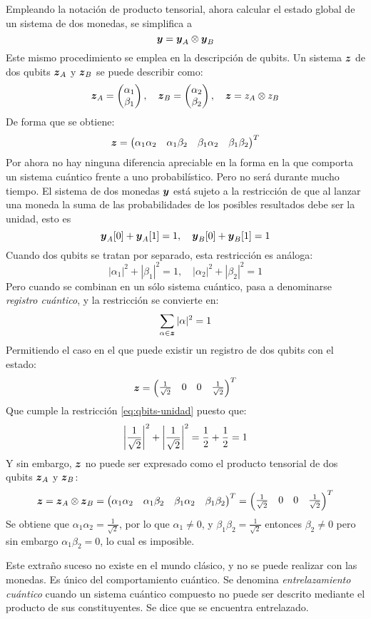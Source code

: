 Empleando la notación de producto tensorial, ahora calcular el estado global de 
un sistema de dos monedas, se simplifica a
%
$$ \boldsymbol{y} = \boldsymbol{y}_A \otimes \boldsymbol{y}_B $$
%
Este mismo procedimiento se emplea en la descripción de qubits. Un sistema $\boldsymbol{z}$ de dos qubits $\boldsymbol{z}_A$ y $\boldsymbol{z}_B$ se puede describir como:
%
$$
\boldsymbol{z}_A = \begin{pmatrix} \alpha_1 \\ \beta_1 \end{pmatrix}, \quad
\boldsymbol{z}_B = \begin{pmatrix} \alpha_2 \\ \beta_2 \end{pmatrix}, \quad
\boldsymbol{z} = z_A \otimes z_B $$
%
De forma que se obtiene:
%
$$
\boldsymbol{z} = \begin{pmatrix} \alpha_1 \alpha_2 & \alpha_1 \beta_2
	& \beta_1 \alpha_2 & \beta_1 \beta_2 \end{pmatrix}^T $$
%
Por ahora no hay ninguna diferencia apreciable en la forma en la que comporta un 
sistema cuántico frente a uno probabilístico. Pero no será durante mucho tiempo.
El sistema de dos monedas $\boldsymbol{y}$ está sujeto a la restricción de que al lanzar 
una moneda la suma de las probabilidades de los posibles resultados debe ser la 
unidad, esto es
%
$$ \boldsymbol{y}_A[0] + \boldsymbol{y}_A[1] = 1, \quad \boldsymbol{y}_B[0] + \boldsymbol{y}_B[1] = 1$$
%
Cuando dos qubits se tratan por separado, esta restricción es análoga:
%
$$|\alpha_1|^2 + |\beta_1|^2 = 1, \quad |\alpha_2|^2 + |\beta_2|^2 = 1$$
%
Pero cuando se combinan en un sólo sistema cuántico, pasa a denominarse 
\textit{registro cuántico}, y la restricción se convierte en:
\begin{equation}
\label{eq:qbits-unidad}
\sum_{\alpha \in \boldsymbol{z}} |\alpha|^2 = 1
\end{equation}
%
Permitiendo el caso en el que puede existir un registro de dos qubits con el 
estado:
$$ \boldsymbol{z} = \begin{pmatrix} \frac{1}{\sqrt{2}} & 0 & 0 & \frac{1}{\sqrt{2}} \end{pmatrix}^T $$
Que cumple la restricción \eqref{eq:qbits-unidad} puesto que:
$$ \left|\frac{1}{\sqrt{2}}\right|^2 + \left|\frac{1}{\sqrt{2}}\right|^2 = \frac{1}{2} + 
\frac{1}{2} = 
1 $$
Y sin embargo, $\boldsymbol{z}$ no puede ser expresado como el producto tensorial de dos 
qubits $\boldsymbol{z}_A$ y $\boldsymbol{z}_B$:
$$ \boldsymbol{z} = \boldsymbol{z}_A \otimes \boldsymbol{z}_B = \begin{pmatrix} \alpha_1 \alpha_2 & \alpha_1 \beta_2
	& \beta_1 \alpha_2 & \beta_1 \beta_2 \end{pmatrix}^T = \begin{pmatrix} \frac{1}{\sqrt{2}} & 0 & 0 & 
\frac{1}{\sqrt{2}} \end{pmatrix}^T
$$
Se obtiene que $\alpha_1 \alpha_2 = \frac{1}{\sqrt{2}}$, por lo que $\alpha_1 
\neq 0$, y $\beta_1 \beta_2 = \frac{1}{\sqrt{2}}$ entonces $\beta_2 \neq 0$ 
pero sin embargo $\alpha_1 \beta_2 = 0$, lo cual es imposible.

Este extraño suceso no existe en el mundo clásico, y no se puede realizar con 
las monedas. Es único del comportamiento cuántico. Se denomina 
\textit{entrelazamiento cuántico} cuando un sistema cuántico compuesto no puede 
ser descrito mediante el producto de sus constituyentes. Se dice que se 
encuentra entrelazado.

